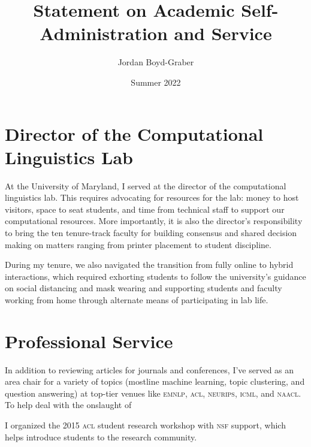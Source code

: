 \documentclass[11pt]{amsart}
\newcommand{\abr}[1]{\textsc{#1}}
\begin{document}
 \title{Statement on Academic Self-Administration and Service}

 \author{Jordan Boyd-Graber}
\address{University of Maryland}

\date{Summer 2022}


\keywords{}

\maketitle

\section{Director of the Computational Linguistics Lab}

At the University of Maryland, I served at the director of the
computational linguistics lab.
%
This requires advocating for resources for the lab: money to host
visitors, space to seat students, and time from technical staff to
support our computational resources.
%
More importantly, it is also the director's responsibility to bring
the ten tenure-track faculty for building consensus and shared
decision making on matters ranging from printer placement to student
discipline.

During my tenure, we also navigated the transition from fully online
to hybrid interactions, which required exhorting students to follow
the university's guidance on social distancing and mask wearing and
supporting students and faculty working from home through alternate
means of participating in lab life.

\section{Professional Service}

In addition to reviewing articles for journals and conferences, I've
served as an area chair for a variety of topics (mostline machine
learning, topic clustering, and question answering) at top-tier venues
like \abr{emnlp}, \abr{acl}, \abr{neurips}, \abr{icml}, and
\abr{naacl}.  To help deal with the onslaught of 

I organized the 2015 \abr{acl} student research workshop with
\abr{nsf} support, which helps introduce students to the research
community.




\end{document}

